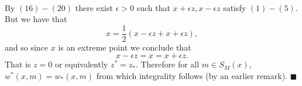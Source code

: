 \documentclass[letterpaper,12pt,oneside,onecolumn]{article}
\begin{document}
\paragraph{}
By $(16) - (20)$ there exist $\epsilon > 0$ such that $x + \epsilon z, x - \epsilon z$ satisfy $(1) - (5)$. But we have that
$$ x = \frac{1}{2}(x - \epsilon z + x + \epsilon z), $$
and so since $x$ is an extreme point we conclude that
$$ x - \epsilon z = x = x + \epsilon z. $$
That is $z = 0$ or equivalently $z^* = z_*$. Therefore for all $m \in S_M(x)$, $w^*(x,m) = w_*(x,m)$ from which integrality follows (by an earlier remark). $\blacksquare$
\end{document}
